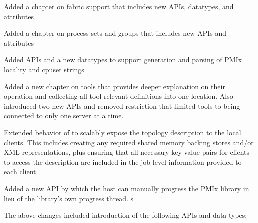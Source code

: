 \begin{compactitemize}
    \item Added a chapter on fabric support that includes new \acp{API}, datatypes, and attributes
    \item Added a chapter on process sets and groups that includes new \acp{API} and attributes
    \item Added \acp{API} and a new datatypes to support generation and parsing of \ac{PMIx} locality and cpuset strings
    \item Added a new chapter on tools that provides deeper explanation on their operation and collecting all tool-relevant definitions into one location. Also introduced two new \acp{API} and removed restriction that limited tools to being connected to only one server at a time.
    \item Extended behavior of  to scalably expose the topology description to the local clients. This includes creating any required shared memory backing stores and/or \ac{XML} representations, plus ensuring that all necessary key-value pairs for clients to access the description are included in the job-level information provided to each client.
    \item Added a new \ac{API} by which the host can manually progress the \ac{PMIx} library in lieu of the library's own progress thread.
s\end{compactitemize}

The above changes included introduction of the following \acp{API} and data types:


